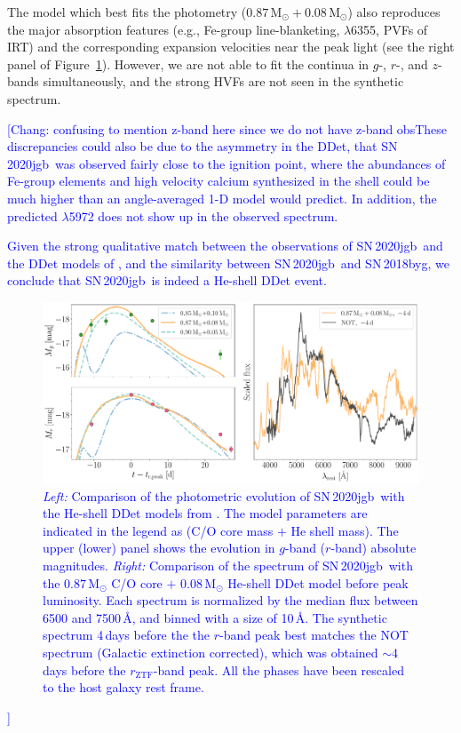 \documentclass[twocolumn]{aastex631}
\newcommand{\sn}{SN\,2020jgb}
\newcommand{\chang}[1]{\textcolor{blue}{[Chang: #1]}}
\begin{document}
The model which best fits the photometry ($0.87\,\mathrm{M_\odot}+0.08\,\mathrm{M_\odot}$) also reproduces the major absorption features (e.g., Fe-group line-blanketing,  $\lambda$6355, PVFs of  IRT) and the corresponding expansion velocities near the peak light (see the right panel of Figure~\ref{fig:model}). However, we are not able to fit the continua in $g$-, $r$-, and $z$-bands simultaneously, and the strong  HVFs are not seen in the synthetic spectrum. \chang{confusing to mention z-band here since we do not have z-band obsThese discrepancies could also be due to the asymmetry in the DDet, that \sn\ was observed fairly close to the ignition point, where the abundances of Fe-group elements and high velocity calcium synthesized in the shell could be much higher than an angle-averaged 1-D model would predict.
In addition, the predicted \ion{Si}{2} $\lambda$5972 does not show up in the observed spectrum.

Given the strong qualitative match between the observations of \sn\ and the DDet models of \citet{polin_observational_2019}, and the similarity between \sn\ and SN\,2018byg, we conclude that \sn\ is indeed a He-shell DDet event. 

\begin{figure}
    \centering
    \includegraphics[width=\textwidth]{model.pdf}
    \caption{{\it Left:} Comparison of the photometric evolution of \sn\ with the He-shell DDet models from \citet{polin_observational_2019}. The model parameters are indicated in the legend as (C/O core mass $+$ He shell mass). The upper (lower) panel shows the evolution in $g$-band ($r$-band) absolute magnitudes. {\it Right:} Comparison of the spectrum of \sn\ with the $0.87\,\mathrm{M_\odot}$ C/O core $+$ $0.08\,\mathrm{M_\odot}$ He-shell DDet model before peak luminosity. Each spectrum is normalized by the median flux between 6500 and 7500\,\AA, and binned with a size of 10\,\AA. The synthetic spectrum 4\,days before the the $r$-band peak best matches the NOT spectrum (Galactic extinction corrected), which was obtained $\sim$4\,days before the $r_\mathrm{ZTF}$-band peak. All the phases have been rescaled to the host galaxy rest frame.}
    \label{fig:model}
\end{figure}

}
\end{document}
